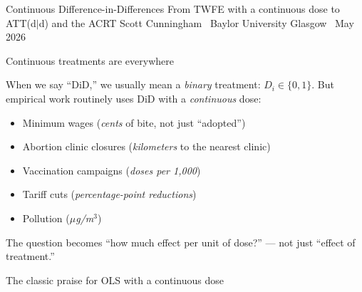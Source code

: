 \documentclass[aspectratio=169,12pt,t]{beamer}
\begin{document}

\remixtitleframe
  {Continuous Difference-in-Differences}
  {From TWFE with a continuous dose to ATT(d$|$d) and the ACRT}
  {Scott Cunningham \textperiodcentered\ Baylor University}
  {Glasgow \textperiodcentered\ May 2026}


\begin{frame}{Continuous treatments are everywhere}
\vspace{0.2cm}

When we say ``DiD,'' we usually mean a \textit{binary} treatment: $D_i \in \{0,1\}$. \;But empirical work routinely uses DiD with a \textit{continuous} dose:

\vspace{0.4cm}
\begin{itemize}\small\setlength\itemsep{1pt}
  \item Minimum wages (\textit{cents} of bite, not just ``adopted'')
  \item Abortion clinic closures (\textit{kilometers} to the nearest clinic)
  \item Vaccination campaigns (\textit{doses per 1{,}000})
  \item Tariff cuts (\textit{percentage-point reductions})
  \item Pollution (\textit{$\mu$g/m$^3$})
\end{itemize}

\vspace{0.3cm}
 \;The question becomes ``how much effect per unit of dose?'' --- not just ``effect of treatment.''
\end{frame}

\begin{frame}{The classic praise for OLS with a continuous dose}
\vspace{0.2cm}


\vspace{0.5cm}


\vspace{0.4em}
\end{frame}
\end{document}
